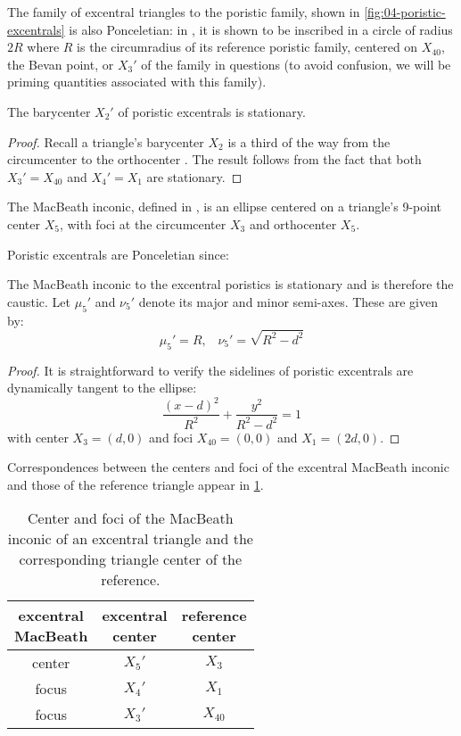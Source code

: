 The family of excentral triangles to the poristic family, shown in \cref{fig:04-poristic-excentrals} is also Ponceletian: in \cite{odehnal2011-poristic}, it is shown to be inscribed in a circle of radius $2R$ where $R$ is the circumradius of its reference poristic family, centered on $X_{40}$, the Bevan point, or $X_3'$ of the family in questions (to avoid confusion, we will be priming quantities associated with this family).

\begin{proposition}
The barycenter $X_2'$ of poristic excentrals is stationary.
\end{proposition}

\begin{proof}
Recall a triangle's barycenter $X_2$ is a third of the way from the circumcenter to the orthocenter \cite[Euler Line, Eqn. 6]{mw}. The result follows from the fact that both $X_3'=X_{40}$ and $X_4'=X_1$ are stationary.
\end{proof}

The MacBeath inconic, defined in \cite[MacBeath Inconic]{mw}, is an ellipse centered on a triangle's 9-point center $X_5$, with  foci at the circumcenter $X_3$ and orthocenter $X_5$.

Poristic excentrals are Ponceletian since:

\begin{proposition}
The MacBeath inconic to the excentral poristics is stationary and is therefore the caustic. Let $\mu_5'$ and $\nu_5'$ denote its major and minor semi-axes. These are given by:
\[ \mu_5'=R,\;\;\;\nu_5'=\sqrt{R^2-d^2} \]
\end{proposition}

\begin{proof}
It is straightforward to verify the sidelines of poristic excentrals are dynamically  tangent to the ellipse:
\[
\frac{(x-d)^2}{R^2}+\frac{y^2}{R^2-d^2}=1\]
with center $X_3=(d,0)$ and foci $X_{40}=(0,0)$ and $X_1=(2d,0)$.
\end{proof}

Correspondences between the centers and foci of the excentral MacBeath inconic and those of the reference triangle appear in \cref{tab:04-macbeath}.

\begin{table}
\centering
\begin{tabular}{|c|c|c|}
\hline
\makecell[cc]{excentral\\ MacBeath} &
\makecell[cc]{excentral\\center} &
\makecell[cc]{reference\\center} \\
\hline
center & $X_5'$ & $X_3$\\
focus & $X_4'$ & $X_1$  \\
focus & $X_3'$ & $X_{40}$ \\
\hline
\end{tabular}
\caption{Center and foci of the MacBeath inconic of an excentral triangle and the corresponding triangle center of the reference.} 
\label{tab:04-macbeath}
\end{table}

